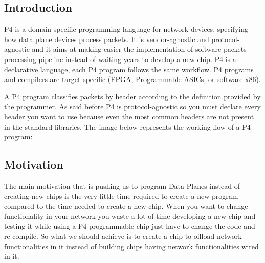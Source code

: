 \documentclass[../sn.tex]{subfiles}
\begin{document}
\subsection{Introduction}
P4 is a domain-specific programming language for network devices, specifying how data plane devices process packets.
It is vendor-agnostic and protocol-agnostic and it aims at making easier the implementation of software packets processing pipeline instead of waiting years to develop a new chip.
P4 is a declarative language, each P4 program follows the same workflow.
P4 programs and compilers are target-specific (FPGA, Programmable ASICs, or software x86).

A P4 program classifies packets by header according to the definition provided by the programmer.
As said before P4 is protocol-agnostic so you must declare every header you want to use because even the most common headers are not present in the standard libraries.
The image below represents the working flow of a P4 program:

\subsection{Motivation}
The main motivation that is pushing us to program Data Planes instead of creating new chips is the very little time required to create a new program compared to the time needed to create a new chip.
When you want to change functionality in your network you waste a lot of time developing a new chip and testing it while using a P4 programmable chip just have to change the code and re-compile.
So what we should achieve is to create a chip to offload network functionalities in it instead of building chips having network functionalities wired in it.
\end{document}
